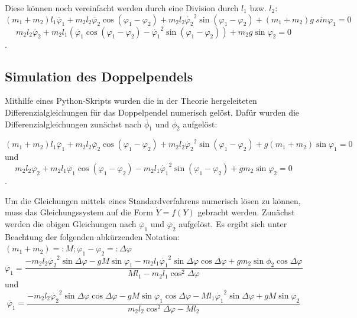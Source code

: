 Diese können noch vereinfacht werden durch eine Division durch $l_1$ bzw. $l_2$: 
\begin{equation}
(m_1 + m_2) l_1\ddot{\varphi_1} + m_2 l_2 \ddot{\varphi_2} \cos (\varphi_1 - \varphi_2) + m_2 l_2 \dot{\varphi_2}^2 \sin (\varphi_1 - \varphi_2) + (m_1 + m_2) g \ sin \varphi_1 = 0
\end{equation}
\begin{equation}
m_2 l_2 \ddot{\varphi_2} + m_2 l_1 (\ddot{\varphi_1} \cos (\varphi_1 - \varphi_2) - \dot{\varphi_1}^2 \sin (\varphi_1 - \varphi_2)) + m_2 g \sin \varphi_2 = 0
\end{equation}
. 
\subsection{Simulation des Doppelpendels}
Mithilfe eines Python-Skripts wurden die in der Theorie hergeleiteten Differenzialgleichungen für das Doppelpendel numerisch gelöst. Dafür wurden die Differenzialgleichungen zunächst nach $ \ddot{\phi_1} $ und $\ddot{\phi_2} $ aufgelöst: 

\begin{equation}
(m_1 + m_2) l_1 \ddot{\varphi_1}  + m_2 l_2 \ddot{\varphi_2} \cos{(\varphi_1 - \varphi_2)} + m_2 l_2 \dot{\varphi_2}^{2} \sin{(\varphi_1 - \varphi_2)} + g (m_1 + m_2) \sin{\varphi_1} = 0
\end{equation} 
und
\begin{equation}
m_2 l_2 \ddot{\varphi_2} + m_2 l_1 \ddot{\varphi_1} \cos{(\varphi_1 - \varphi_2)} - m_2 l_1 \dot{\varphi_1}^{2} \sin{(\varphi_1 - \varphi_2)} + g m_2 \sin{\varphi_2} = 0
\end{equation}
. 

Um die Gleichungen mittels eines Standardverfahrens numerisch lösen zu können, muss das Gleichungssystem auf die Form $ \dot{Y} = f(Y) $ gebracht werden. Zunächst werden die obigen Gleichungen nach $ \ddot{\varphi_1} $ und $ \ddot{\varphi_2} $ aufgelöst. Es ergibt sich unter Beachtung der folgenden abkürzenden Notation: 
$ (m_1 + m_2) =: M; \varphi_1 - \varphi_2 =: \Delta \varphi $
\begin{equation}
\ddot{\varphi_1} = \frac{-m_2 l_2 \dot{\varphi_2}^{2} \sin{\Delta \varphi} - g M \sin{\varphi_1} - m_2 l_1 \dot{\varphi_1}^{2} \sin{\Delta \varphi} \cos{\Delta \varphi} + g m_2 \sin{\phi_2}\cos{\Delta  \varphi}}{M l_1 - m_2 l_1 \cos^{2}{\Delta \varphi}}
\end{equation}
und
\begin{equation} 
\ddot{\varphi_1} = \frac{-m_2 l_2 \dot{\varphi_2}^{2} \sin{\Delta \varphi} \cos{\Delta \varphi} - g M \sin{\varphi_1} \cos{\Delta \varphi} - M l_1 \dot{\varphi_1}^{2} \sin{\Delta \varphi} + g M \sin{\varphi_2}}{m_2 l_2 \cos^{2}{\Delta \varphi} - M l_2}
\end{equation}

